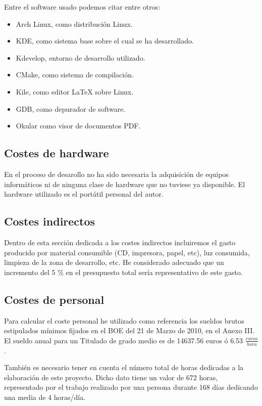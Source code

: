 Entre el software usado podemos citar entre otros:
    
\begin{itemize}
    \item Arch Linux, como distribución Linux.
    \item KDE, como sistema base sobre el cual se ha desarrollado.
    \item Kdevelop, entorno de desarrollo utilizado.
    \item CMake, como sistema de compilación.
    \item Kile, como editor \LaTeX{} sobre Linux.
    \item GDB, como depurador de software.
    \item Okular como visor de documentos PDF.
\end{itemize}

\subsection{Costes de hardware}

En el proceso de desarollo no ha sido necesaria la adquisición de equipos informáticos ni de ninguna clase de hardware que no tuviese ya disponible. El hardware utilizado es el portátil personal del autor. 

\subsection{Costes indirectos}

Dentro de esta sección dedicada a los costes indirectos incluiremos el gasto producido por material consumible (CD, impresora, papel, etc), luz consumida, limpieza de la zona de desarrollo, etc. He considerado adecuado que un incremento del 5 \% en el presupuesto total sería representativo de este gasto.
    
\subsection{Costes de personal}

Para calcular el coste personal he utilizado como referencia los sueldos brutos estipulados mínimos fijados en el BOE del 21 de Marzo de 2010, en el Anexo III. El sueldo anual para un Titulado de grado medio es de 14637.56 euros ó 6.53 $\frac{euros}{hora}$. 

También es necesario tener en cuenta el número total de horas dedicadas a la elaboración de este proyecto. Dicho dato tiene un valor de 672 horas, representado por el trabajo realizado por una persona durante 168 días dedicando una media de 4 horas/día.
    
